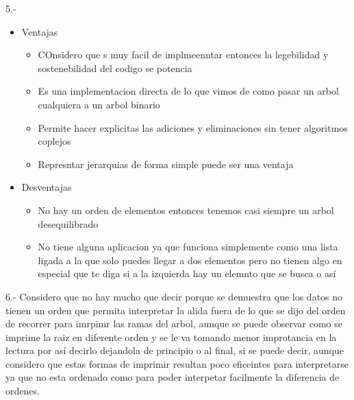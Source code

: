 \begin{respuesta}{5.-}
    \begin{itemize}
        \item Ventajas \begin{itemize}
            \item COnsidero que s muy facil de implmeenntar entonces la legebilidad y sostenebilidad del codigo se potencia
            \item Es una implementacion directa de lo que vimos de como pasar un arbol cualquiera a un arbol binario
            \item Permite hacer explicitas las adiciones y eliminaciones sin tener algoritmos coplejos
            \item Represntar jerarquias de forma simple puede ser una ventaja
        \end{itemize}
        \item Desventajas\begin{itemize}
            \item No hay un orden de elementos entonces tenemos casi siempre un arbol desequilibrado
            \item No tiene alguna aplicacion ya que funciona simplemente como una lista ligada a la que solo puedes llegar a dos elementos pero no tienen algo en especial que te diga si a la izquierda hay un elemnto que se busca o así
        \end{itemize}
    \end{itemize}
\end{respuesta}
\begin{respuesta}{6.-}
    Considero que no hay mucho que decir porque se demuestra que los datos no tienen un orden que permita interpretar la alida fuera de lo que se dijo del orden de recorrer para imrpimr las ramas del arbol, aunque se puede observar como se imprime la raiz en diferente orden y se le va tomando menor improtancia en la lectura por así decirlo dejandola de principio o al final, si se puede decir, aunque considero que estas formas de imprimir resultan poco eficeintes para interpretarse ya que no esta ordenado como para poder interpetar facilmente la diferencia de ordenes.
\end{respuesta}
